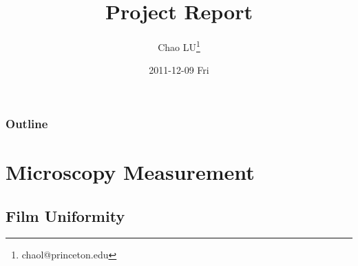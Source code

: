 \documentclass[bigger, english, 10pt, presentation]{beamer}
\title{Project Report}
\author{Chao LU\thanks{chaol@princeton.edu}}
\date{2011-12-09 Fri}
\begin{document}
\maketitle

\begin{frame}
\frametitle{Outline}
\setcounter{tocdepth}{3}
\tableofcontents
\end{frame}



\section{Microscopy Measurement}
\label{sec-1}
\subsection{Film Uniformity}
\label{sec-1-1}
\end{document}
